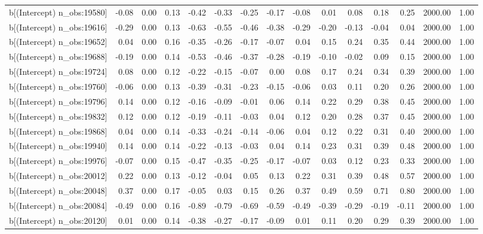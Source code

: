 \begin{table}[ht]
\begin{tabular}{rrrrrrrrrrrrrrr}
  b[(Intercept) n\_obs:19580] & -0.08 & 0.00 & 0.13 & -0.42 & -0.33 & -0.25 & -0.17 & -0.08 & 0.01 & 0.08 & 0.18 & 0.25 & 2000.00 & 1.00 \\ 
  b[(Intercept) n\_obs:19616] & -0.29 & 0.00 & 0.13 & -0.63 & -0.55 & -0.46 & -0.38 & -0.29 & -0.20 & -0.13 & -0.04 & 0.04 & 2000.00 & 1.00 \\ 
  b[(Intercept) n\_obs:19652] & 0.04 & 0.00 & 0.16 & -0.35 & -0.26 & -0.17 & -0.07 & 0.04 & 0.15 & 0.24 & 0.35 & 0.44 & 2000.00 & 1.00 \\ 
  b[(Intercept) n\_obs:19688] & -0.19 & 0.00 & 0.14 & -0.53 & -0.46 & -0.37 & -0.28 & -0.19 & -0.10 & -0.02 & 0.09 & 0.15 & 2000.00 & 1.00 \\ 
  b[(Intercept) n\_obs:19724] & 0.08 & 0.00 & 0.12 & -0.22 & -0.15 & -0.07 & 0.00 & 0.08 & 0.17 & 0.24 & 0.34 & 0.39 & 2000.00 & 1.00 \\ 
  b[(Intercept) n\_obs:19760] & -0.06 & 0.00 & 0.13 & -0.39 & -0.31 & -0.23 & -0.15 & -0.06 & 0.03 & 0.11 & 0.20 & 0.26 & 2000.00 & 1.00 \\ 
  b[(Intercept) n\_obs:19796] & 0.14 & 0.00 & 0.12 & -0.16 & -0.09 & -0.01 & 0.06 & 0.14 & 0.22 & 0.29 & 0.38 & 0.45 & 2000.00 & 1.00 \\ 
  b[(Intercept) n\_obs:19832] & 0.12 & 0.00 & 0.12 & -0.19 & -0.11 & -0.03 & 0.04 & 0.12 & 0.20 & 0.28 & 0.37 & 0.45 & 2000.00 & 1.00 \\ 
  b[(Intercept) n\_obs:19868] & 0.04 & 0.00 & 0.14 & -0.33 & -0.24 & -0.14 & -0.06 & 0.04 & 0.12 & 0.22 & 0.31 & 0.40 & 2000.00 & 1.00 \\ 
  b[(Intercept) n\_obs:19940] & 0.14 & 0.00 & 0.14 & -0.22 & -0.13 & -0.03 & 0.04 & 0.14 & 0.23 & 0.31 & 0.39 & 0.48 & 2000.00 & 1.00 \\ 
  b[(Intercept) n\_obs:19976] & -0.07 & 0.00 & 0.15 & -0.47 & -0.35 & -0.25 & -0.17 & -0.07 & 0.03 & 0.12 & 0.23 & 0.33 & 2000.00 & 1.00 \\ 
  b[(Intercept) n\_obs:20012] & 0.22 & 0.00 & 0.13 & -0.12 & -0.04 & 0.05 & 0.13 & 0.22 & 0.31 & 0.39 & 0.48 & 0.57 & 2000.00 & 1.00 \\ 
  b[(Intercept) n\_obs:20048] & 0.37 & 0.00 & 0.17 & -0.05 & 0.03 & 0.15 & 0.26 & 0.37 & 0.49 & 0.59 & 0.71 & 0.80 & 2000.00 & 1.00 \\ 
  b[(Intercept) n\_obs:20084] & -0.49 & 0.00 & 0.16 & -0.89 & -0.79 & -0.69 & -0.59 & -0.49 & -0.39 & -0.29 & -0.19 & -0.11 & 2000.00 & 1.00 \\ 
  b[(Intercept) n\_obs:20120] & 0.01 & 0.00 & 0.14 & -0.38 & -0.27 & -0.17 & -0.09 & 0.01 & 0.11 & 0.20 & 0.29 & 0.39 & 2000.00 & 1.00 \\ 

\end{tabular}
\end{table}
